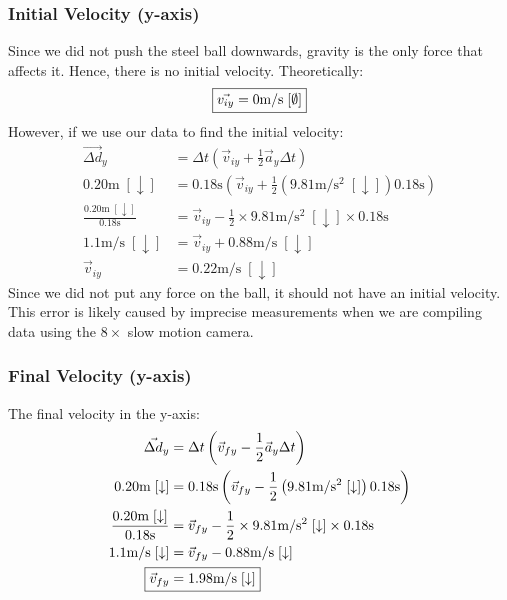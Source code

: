 \documentclass[a4paper,12pt]{article}
\begin{document}
	\subsubsection{Initial Velocity (y-axis)}
	Since we did not push the steel ball downwards, gravity is the only force that affects it. Hence, there is no initial velocity. Theoretically:
	\begin{align*}
		\Aboxed{\vec{v_{iy}}&=0\text{m}/\text{s}\;[\emptyset]}\\
	\end{align*}
	However, if we use our data to find the initial velocity:
	\begin{align*}
		\vec{\Delta d}_y&=\Delta t\left(\vec{v}_{iy}+\frac{1}{2}\vec{a}_y\Delta t\right)\\
		0.20\text{m}\;[\downarrow]&=0.18\text{s}\left(\vec{v}_{iy}+\frac{1}{2}\left(9.81\text{m}/\text{s}^2\;[\downarrow]\right)0.18\text{s}\right)\\
		\frac{0.20\text{m}\;[\downarrow]}{0.18\text{s}}&=\vec{v}_{iy}-\frac{1}{2}\times9.81\text{m}/\text{s}^2\;[\downarrow]\times0.18\text{s}\\
		1.1\text{m}/\text{s}\;[\downarrow]&=\vec{v}_{iy}+0.88\text{m}/\text{s}\;[\downarrow]\\
		\vec{v}_{iy}&=0.22\text{m}/\text{s}\;[\downarrow]
	\end{align*}
	Since we did not put any force on the ball, it should not have an initial velocity. This error is likely caused by imprecise measurements when we are compiling data using the $8\times$ slow motion camera. 
	
	\subsubsection{Final Velocity (y-axis)}
	The final velocity in the y-axis:
	\begin{align*}
		\vec{\Delta d}_y&=\Delta t\left(\vec{v}_{fy}-\frac{1}{2}\vec{a}_y\Delta t\right)\\
		0.20\text{m}\;[\downarrow]&=0.18\text{s}\left(\vec{v}_{fy}-\frac{1}{2}\left(9.81\text{m}/\text{s}^2\;[\downarrow]\right)0.18\text{s}\right)\\
		\frac{0.20\text{m}\;[\downarrow]}{0.18\text{s}}&=\vec{v}_{fy}-\frac{1}{2}\times9.81\text{m}/\text{s}^2\;[\downarrow]\times0.18\text{s}\\
		1.1\text{m}/\text{s}\;[\downarrow]&=\vec{v}_{fy}-0.88\text{m}/\text{s}\;[\downarrow]\\
		\Aboxed{\vec{v}_{fy}&=1.98\text{m}/\text{s}\;[\downarrow]}
	\end{align*}
	\newpage
\end{document}

